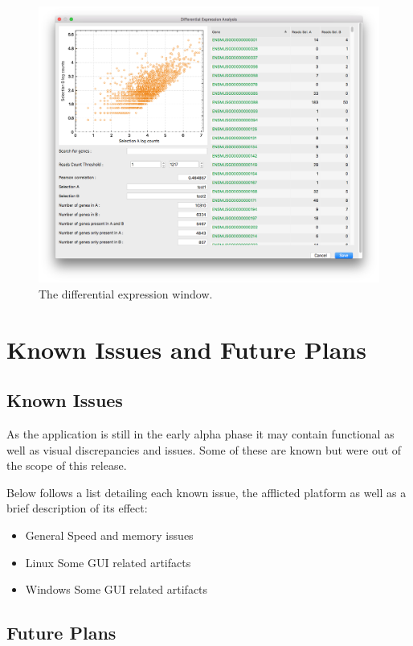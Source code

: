 \documentclass[10pt,a4paper,titlepage]{book}
\begin{document}
\begin{figure}[h]
	\centering
	\includegraphics[width=0.8\linewidth]{./Pictures/DE_view}
	\caption[The differential expression window.]{The differential expression window.}
\end{figure}

\chapter{Known Issues and Future Plans}
\section{Known Issues}

As the application is still in the early alpha phase it may contain functional as well as visual discrepancies and issues. Some of these are known but were out of the scope of this release.

Below follows a list detailing each known issue, the afflicted platform as well as a brief description of its effect:

\begin{itemize}
\item	General
\subitem		Speed and memory issues
\item	Linux
\subitem		Some GUI related artifacts
\item	Windows
\subitem		Some GUI related artifacts
\end{itemize}

\section{Future Plans}
\end{document}
